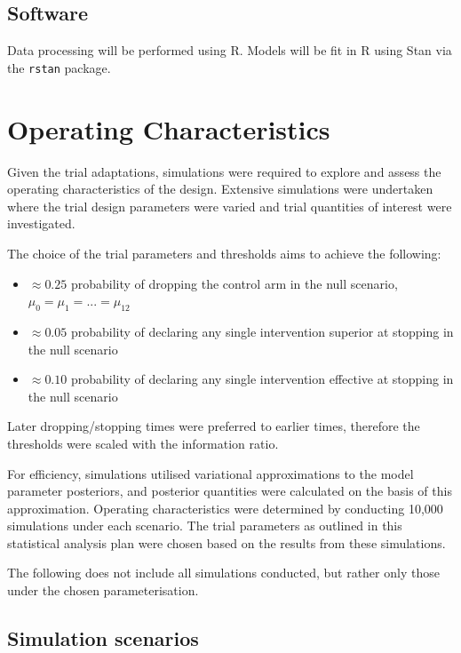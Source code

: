 \documentclass[
  bibliography=totoc]{scrreprt}
\providecommand{\tightlist}{%
  \setlength{\itemsep}{0pt}\setlength{\parskip}{0pt}}
\begin{document}
\hypertarget{software}{%
\section{Software}\label{software}}

Data processing will be performed using R.
Models will be fit in R using Stan via the \texttt{rstan} package.

\hypertarget{operating-characteristics}{%
\chapter{Operating Characteristics}\label{operating-characteristics}}

Given the trial adaptations, simulations were required to explore and assess the operating characteristics of the design.
Extensive simulations were undertaken where the trial design parameters were varied and trial quantities of interest were investigated.

The choice of the trial parameters and thresholds aims to achieve the following:

\begin{itemize}
\tightlist
\item
  \(\approx 0.25\) probability of dropping the control arm in the null scenario, \(\mu_0 = \mu_1 = ... = \mu_{12}\)
\item
  \(\approx 0.05\) probability of declaring any single intervention superior at stopping in the null scenario
\item
  \(\approx 0.10\) probability of declaring any single intervention effective at stopping in the null scenario
\end{itemize}

Later dropping/stopping times were preferred to earlier times, therefore the thresholds were scaled with the information ratio.

For efficiency, simulations utilised variational approximations to the model parameter posteriors, and posterior quantities were calculated on the basis of this approximation.
Operating characteristics were determined by conducting 10,000 simulations under each scenario.
The trial parameters as outlined in this statistical analysis plan were chosen based on the results from these simulations.

The following does not include all simulations conducted, but rather only those under the chosen parameterisation.

\hypertarget{simulation-scenarios}{%
\section{Simulation scenarios}\label{simulation-scenarios}}
\end{document}
